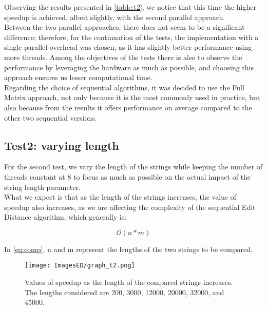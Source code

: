 \documentclass[10pt,twocolumn,letterpaper]{article}
\begin{document}
Observing the results presented in \cref{table:t2}, we notice that this time the higher speedup is achieved, albeit slightly, with the second parallel approach.\\
Between the two parallel approaches, there does not seem to be a significant difference; therefore, for the continuation of the tests, the implementation with a single parallel overhead was chosen, as it has slightly better performance using more threads. Among the objectives of the tests there is also to observe the performance by leveraging the hardware as much as possible, and choosing this approach ensures us lesser computational time.\\
Regarding the choice of sequential algorithms, it was decided to use the Full Matrix approach, not only because it is the most commonly used in practice, but also because from the results it offers performance on average compared to the other two sequential versions.

\subsection{Test2: varying length}
\label{sec:t2}

For the second test, we vary the length of the strings while keeping the number of threads constant at 8 to focus as much as possible on the actual impact of the string length parameter.\\
What we expect is that as the length of the strings increases, the value of speedup also increases, as we are affecting the complexity of the sequential Edit Distance algorithm, which generally is:

\begin{equation}
    \label{eq:comp}
    \mathcal{O}(n * m)
\end{equation}


In \cref{eq:comp}, n and m represent the lengths of the two strings to be compared.

\begin{figure}[h]
    \centering
    \texttt{[image: ImagesED/graph\_t2.png]}
    \caption{Values of speedup as the length of the compared strings increases. The lengths considered are 200, 3000, 12000, 20000, 32000, and 45000.}
    \label{fig:t2}
\end{figure}
\end{document}
